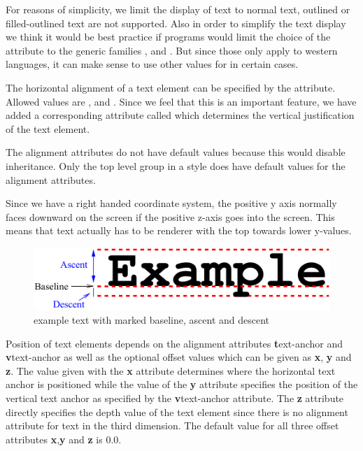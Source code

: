 For reasons of simplicity, we limit the display of text to normal text, 
outlined or filled-outlined text are not supported. Also in order to simplify the
text display we think it would be best practice if programs would limit the 
choice of the  attribute to the generic families , 
and . But since those only apply to western languages, it can make
sense to use other values for  in certain cases.

The horizontal alignment of a text element can be specified by the 
 attribute. Allowed values are ,  and .  Since we feel that this is an important feature, we
have added a corresponding attribute called  which determines the vertical justification of the
text element. 

The alignment attributes do not have default values because this would disable inheritance. Only the top level group in a style does have default values for the alignment attributes.

Since we have a right handed coordinate system, the positive y axis normally faces downward on the screen if the positive
z-axis goes into the screen. This means that text actually has to be renderer with the top towards lower y-values.

\begin{figure}[!ht]
\begin{center}
\includegraphics[scale=0.60]{figures/VerticalTextPlacement1}
\end{center}
\caption{example text with marked baseline, ascent and descent}
\label{VerticalTextPlacement1}
\end{figure}


{\color{red} Position of text elements depends on the alignment attributes {\textbf text-anchor} and {\textbf vtext-anchor} as well as the optional offset values which can be given as {\textbf x}, {\textbf y} and {\textbf z}}.
{\color{red} The value given with the {\textbf x} attribute determines where the horizontal text anchor is positioned while the value of the {\textbf y} attribute specifies the position of the vertical text anchor as specified by the {\textbf vtext-anchor} attribute. The {\textbf z} attribute directly specifies the depth value of the text element since there is no alignment attribute for text in the third dimension.}
The default value for all three offset attributes {\textbf x},{\textbf y} and {\textbf z} is $0.0$.


